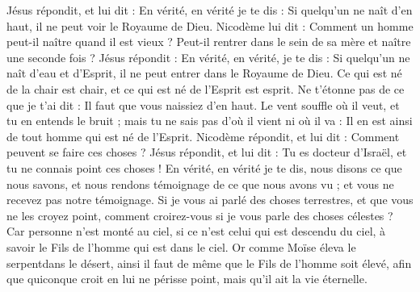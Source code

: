 \begin{multicols}{2}
Jésus répondit, et lui dit : En vérité, en vérité je te dis : Si quelqu'un ne naît d'en haut, il ne peut voir le Royaume de Dieu.
Nicodème lui dit : Comment un homme peut-il naître quand il est vieux ? Peut-il rentrer dans le sein de sa mère et naître une seconde fois ?
Jésus répondit : En vérité, en vérité, je te dis : Si quelqu'un ne naît d'eau et d'Esprit, il ne peut entrer dans le Royaume de Dieu.
Ce qui est né de la chair est chair, et ce qui est né de l'Esprit est esprit.
Ne t'étonne pas de ce que je t'ai dit : Il faut que vous naissiez d'en haut.
Le vent souffle où il veut, et tu en entends le bruit ; mais tu ne sais pas d'où il vient ni où il va : Il en est ainsi de tout homme qui est né de l'Esprit.
Nicodème répondit, et lui dit : Comment peuvent se faire ces choses ?
Jésus répondit, et lui dit : Tu es docteur d'Israël, et tu ne connais point ces choses !
En vérité, en vérité je te dis, nous disons ce que nous savons, et nous rendons témoignage de ce que nous avons vu ; et vous ne recevez pas notre témoignage.
Si je vous ai parlé des choses terrestres, et que vous ne les croyez point, comment croirez-vous si je vous parle des choses célestes ?
Car personne n'est monté au ciel, si ce n'est celui qui est descendu du ciel, à savoir le Fils de l'homme qui est dans le ciel.
Or comme Moïse éleva le serpentdans le désert, ainsi il faut de même que le Fils de l'homme soit élevé,
afin que quiconque croit en lui ne périsse point, mais qu'il ait la vie éternelle.

\end{multicols}
